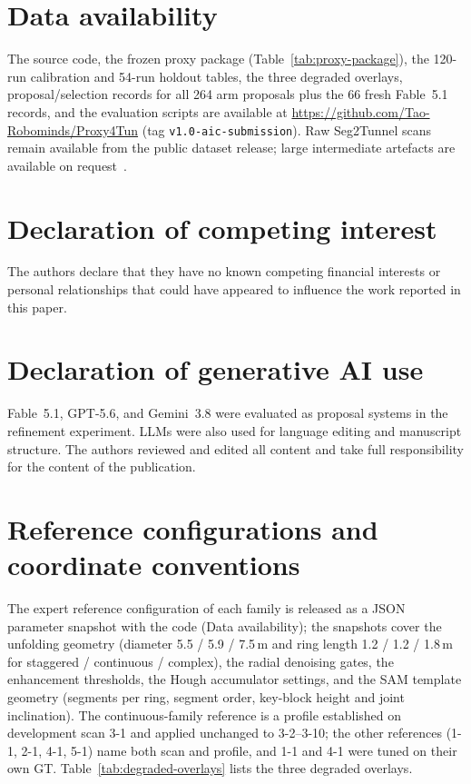 \documentclass[a4paper,fleqn]{cas-dc}
\begin{document}
\section*{Data availability}

The source code, the frozen proxy package (Table~\ref{tab:proxy-package}), the 120-run calibration and 54-run holdout tables, the three degraded overlays, proposal/selection records for all 264 arm proposals plus the 66 fresh Fable~5.1 records, and the evaluation scripts are available at \url{https://github.com/Tao-Robominds/Proxy4Tun} (tag \texttt{v1.0-aic-submission}). Raw Seg2Tunnel scans remain available from the public dataset release; large intermediate artefacts are available on request~\cite{lin2024seg2tunnel}.

\section*{Declaration of competing interest}

The authors declare that they have no known competing financial interests or personal relationships that could have appeared to influence the work reported in this paper.

\section*{Declaration of generative AI use}

Fable~5.1, GPT-5.6, and Gemini~3.8 were evaluated as proposal systems in the refinement experiment. LLMs were also used for language editing and manuscript structure. The authors reviewed and edited all content and take full responsibility for the content of the publication.




\appendix

\section{Reference configurations and coordinate conventions}\label{app:anchor-parameter}

The expert reference configuration of each family is released as a JSON parameter snapshot with the code (Data availability); the snapshots cover the unfolding geometry (diameter 5.5 / 5.9 / 7.5\,m and ring length 1.2 / 1.2 / 1.8\,m for staggered / continuous / complex), the radial denoising gates, the enhancement thresholds, the Hough accumulator settings, and the SAM template geometry (segments per ring, segment order, key-block height and joint inclination). The continuous-family reference is a profile established on development scan 3-1 and applied unchanged to 3-2--3-10; the other references (1-1, 2-1, 4-1, 5-1) name both scan and profile, and 1-1 and 4-1 were tuned on their own GT. Table~\ref{tab:degraded-overlays} lists the three degraded overlays.
\end{document}

